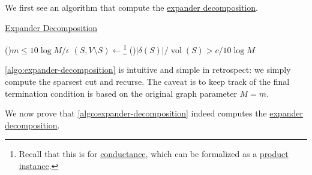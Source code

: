 We first see an algorithm that compute the \hyperref[def:expander-decomposition]{expander decomposition}.

\begin{algorithm}[H]\label{algo:expander-decomposition}
	\DontPrintSemicolon{}
	\caption{\hyperref[def:expander-decomposition]{Expander Decomposition}}

	\BlankLine

	\If(){\(m \leq 10 \log M / \epsilon \)}{
		\;
	}
	\;
	\((S, V\setminus S) \gets\)\footnote{Recall that this is for \hyperref[def:conductance]{conductance}, which can be formalized as a \hyperref[prb:product-instance-of-sparsest-cut]{product instance}.}
	\;
	\uIf(){\(\lvert \delta (S) \rvert / \operatorname{vol}(S) > c / 10 \log M\)}{
		\;
	}
\end{algorithm}

\begin{note}
	\autoref{algo:expander-decomposition} is intuitive and simple in retrospect: we simply compute the sparsest cut and recurse. The caveat is to keep track of the final termination condition is based on the original graph parameter \(M = m\).
\end{note}

We now prove that \autoref{algo:expander-decomposition} indeed computes the \hyperref[def:expander-decomposition]{expander decomposition}.

